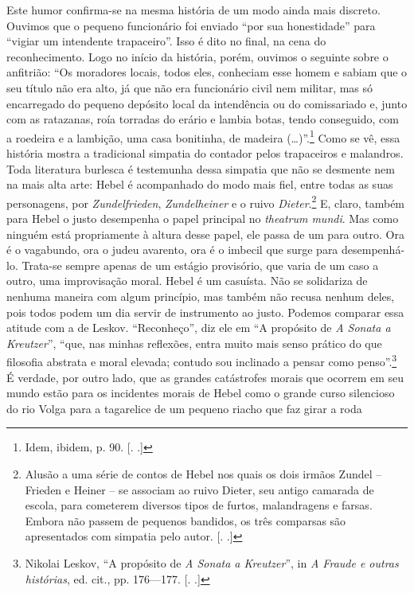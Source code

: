 Este humor confirma-se na mesma história de um modo ainda mais discreto.
Ouvimos que o pequeno funcionário foi enviado ``por sua honestidade''
para ``vigiar um intendente trapaceiro''. Isso é dito no final, na cena
do reconhecimento. Logo no início da história, porém, ouvimos o seguinte
sobre o anfitrião: ``Os moradores locais, todos eles, conheciam esse
homem e sabiam que o seu título não era alto, já que não era funcionário
civil nem militar, mas só encarregado do pequeno depósito local da
intendência ou do comissariado e, junto com as ratazanas, roía torradas
do erário e lambia botas, tendo conseguido, com a roedeira e a lambição,
uma casa bonitinha, de madeira (\ldots{})''.\footnote{Idem, ibidem, p. 90.
  [. .]} Como se vê, essa história mostra a tradicional
simpatia do contador pelos trapaceiros e malandros. Toda literatura
burlesca é testemunha dessa simpatia que não se desmente nem na mais
alta arte: Hebel é acompanhado do modo mais fiel, entre todas as suas
personagens, por \emph{Zundelfrieden}, \emph{Zundelheiner} e o ruivo
\emph{Dieter}.\footnote{Alusão a uma série de contos de Hebel nos quais
  os dois irmãos Zundel -- Frieden e Heiner -- se associam ao ruivo
  Dieter, seu antigo camarada de escola, para cometerem diversos tipos
  de furtos, malandragens e farsas. Embora não passem de pequenos
  bandidos, os três comparsas são apresentados com simpatia pelo autor.
  [. .]} E, claro, também para Hebel o justo desempenha o papel
principal no \emph{theatrum mundi}. Mas como ninguém está propriamente à
altura desse papel, ele passa de um para outro. Ora é o vagabundo, ora o
judeu avarento, ora é o imbecil que surge para desempenhá-lo. Trata-se
sempre apenas de um estágio provisório, que varia de um caso a outro,
uma improvisação moral. Hebel é um casuísta. Não se solidariza de
nenhuma maneira com algum princípio, mas também não recusa nenhum deles,
pois todos podem um dia servir de instrumento ao justo. Podemos comparar
essa atitude com a de Leskov. ``Reconheço'', diz ele em ``A propósito de
\emph{A Sonata a Kreutzer}'', ``que, nas minhas reflexões, entra muito
mais senso prático do que filosofia abstrata e moral elevada; contudo
sou inclinado a pensar como penso''.\footnote{Nikolai Leskov, ``A
  propósito de \emph{A Sonata a Kreutzer}'', in \emph{A Fraude e outras
  histórias}, ed. cit., pp. 176---177. [. .]} É verdade, por
outro lado, que as grandes catástrofes morais que ocorrem em seu mundo
estão para os incidentes morais de Hebel como o grande curso silencioso
do rio Volga para a tagarelice de um pequeno riacho que faz girar a roda
